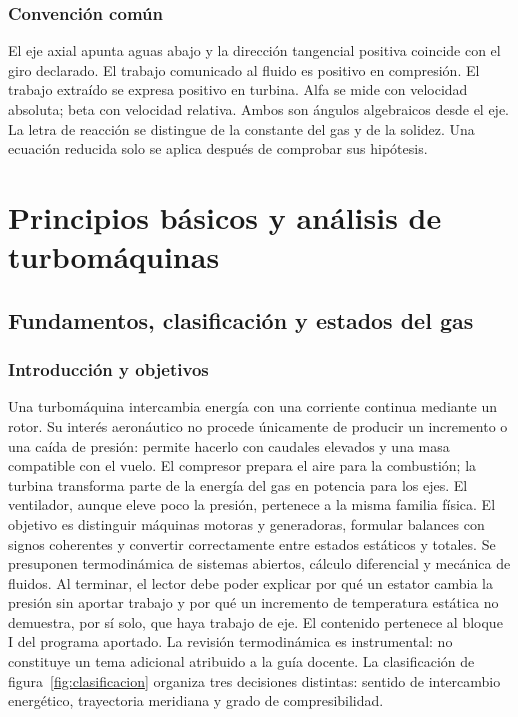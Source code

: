 \documentclass[10pt,openany]{book}
\begin{document}
\section*{Convención común}
El eje axial apunta aguas abajo y la dirección tangencial positiva coincide con el giro declarado. El trabajo comunicado al fluido es positivo en compresión. El trabajo extraído se expresa positivo en turbina. Alfa se mide con velocidad absoluta; beta con velocidad relativa. Ambos son ángulos algebraicos desde el eje. La letra de reacción se distingue de la constante del gas y de la solidez. Una ecuación reducida solo se aplica después de comprobar sus hipótesis.
\clearpage
\tableofcontents
\listoffigures
\mainmatter

\part{Principios básicos y análisis de turbomáquinas}

\chapter{Fundamentos, clasificación y estados del gas}
\label{chap:c01}


\section{Introducción y objetivos}

Una turbomáquina intercambia energía con una corriente continua mediante un rotor. Su interés aeronáutico no procede únicamente de producir un incremento o una caída de presión: permite hacerlo con caudales elevados y una masa compatible con el vuelo. El compresor prepara el aire para la combustión; la turbina transforma parte de la energía del gas en potencia para los ejes. El ventilador, aunque eleve poco la presión, pertenece a la misma familia física.
El objetivo es distinguir máquinas motoras y generadoras, formular balances con signos coherentes y convertir correctamente entre estados estáticos y totales. Se presuponen termodinámica de sistemas abiertos, cálculo diferencial y mecánica de fluidos. Al terminar, el lector debe poder explicar por qué un estator cambia la presión sin aportar trabajo y por qué un incremento de temperatura estática no demuestra, por sí solo, que haya trabajo de eje.
El contenido pertenece al bloque I del programa aportado. La revisión termodinámica es instrumental: no constituye un tema adicional atribuido a la guía docente. La clasificación de figura~\ref{fig:clasificacion} organiza tres decisiones distintas: sentido de intercambio energético, trayectoria meridiana y grado de compresibilidad.
\end{document}

